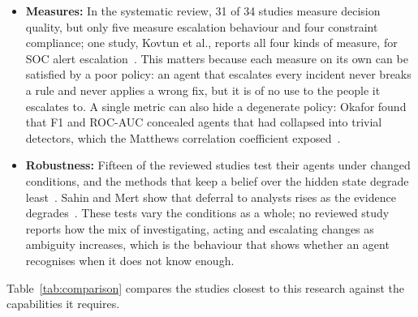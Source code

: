 \begin{itemize}
\item \textbf{Measures:} In the systematic review, 31 of 34 studies measure decision quality, but only five measure escalation behaviour and four constraint compliance; one study, Kovtun et al., reports all four kinds of measure, for SOC alert escalation~\cite{kovtun2026}. This matters because each measure on its own can be satisfied by a poor policy: an agent that escalates every incident never breaks a rule and never applies a wrong fix, but it is of no use to the people it escalates to. A single metric can also hide a degenerate policy: Okafor found that F1 and ROC-AUC concealed agents that had collapsed into trivial detectors, which the Matthews correlation coefficient exposed~\cite{okafor2026}.
\item \textbf{Robustness:} Fifteen of the reviewed studies test their agents under changed conditions, and the methods that keep a belief over the hidden state degrade least~\cite{hammar2025,hammar2026belief}. Sahin and Mert show that deferral to analysts rises as the evidence degrades~\cite{sahin2026}. These tests vary the conditions as a whole; no reviewed study reports how the mix of investigating, acting and escalating changes as ambiguity increases, which is the behaviour that shows whether an agent recognises when it does not know enough.
\end{itemize}

Table~\ref{tab:comparison} compares the studies closest to this research against the capabilities it requires.

